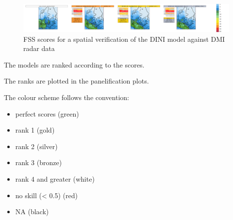 \documentclass[11pt,a4paper]{article}
\begin{document}
\begin{figure}[htbp]
    \centering
    \includegraphics[width=1.2\textwidth]{../PLOTS/panel_Accpcp3h_202401030000+24.png}
    \caption{FSS scores for a spatial verification of the DINI model against DMI radar data}
    \label{fig:TPexample1}
\end{figure}
%
%
%


The models are ranked according to the scores.

The ranks are plotted in the panelification plots.

The colour scheme follows the convention:

\begin{itemize}
\item perfect scores (green)
\item rank 1 (gold)
\item rank 2 (silver)
\item rank 3 (bronze)
\item rank 4 and greater (white)
\item no skill (< 0.5) (red)
\item NA (black)
\end{itemize}
\end{document}
